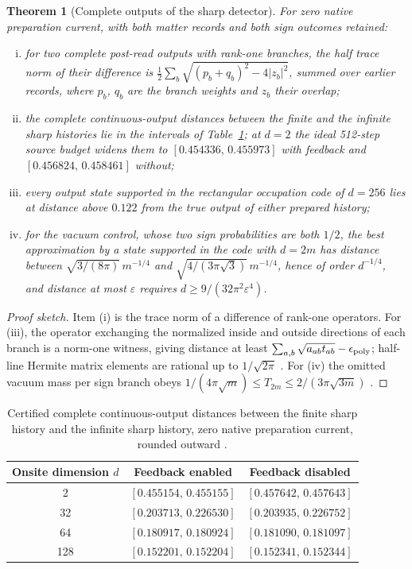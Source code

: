 \documentclass[11pt]{article}
\newtheorem{theorem}{Theorem}[section]
\theoremstyle{definition}
\theoremstyle{remark}
\theoremstyle{plain}
\begin{document}
\begin{theorem}[Complete outputs of the sharp detector]
\label{thm:sharp}
For zero native preparation current, with both matter records and both sign
outcomes retained:
\begin{enumerate}[(i)]
\item for two complete post-read outputs with rank-one branches, the half
trace norm of their difference is
$\frac12\sum_b\sqrt{(p_b+q_b)^2-4\lvert z_b\rvert^2}$, summed over earlier
records, where $p_b$, $q_b$ are the branch weights and $z_b$ their overlap;
\item the complete continuous-output distances between the finite and the
infinite sharp histories lie in the intervals of Table~\ref{tab:sharp}; at
$d=2$ the ideal 512-step source budget widens them to
$[0.454336,\,0.455973]$ with feedback and $[0.456824,\,0.458461]$ without;
\item every output state supported in the rectangular occupation code of
$d=256$ lies at distance above $0.122$ from the true output of either
prepared history;
\item for the vacuum control, whose two sign probabilities are both $1/2$,
the best approximation by a state supported in the code with $d=2m$ has
distance between $\sqrt{3/(8\pi)}\,m^{-1/4}$ and
$\sqrt{4/(3\pi\sqrt3)}\,m^{-1/4}$, hence of order $d^{-1/4}$, and distance at
most $\varepsilon$ requires $d\ge9/(32\pi^2\varepsilon^4)$.
\end{enumerate}
\end{theorem}

\begin{proof}[Proof sketch]
Item (i) is the trace norm of a difference of rank-one operators. For (iii),
the operator exchanging the normalized inside and outside directions of each
branch is a norm-one witness, giving distance at least
$\sum_{a,b}\sqrt{a_{ab}t_{ab}}-\epsilon_{\rm poly}$; half-line Hermite matrix
elements are rational up to $1/\sqrt{2\pi}$ \cite{dlmf}. For (iv) the omitted
vacuum mass per sign branch obeys
$1/(4\pi\sqrt m)\le T_{2m}\le2/(3\pi\sqrt{3m})$ \cite{csREAD}.
\end{proof}

\begin{table}[htbp]
\centering
\small
\caption{Certified complete continuous-output distances between the finite
sharp history and the infinite sharp history, zero native preparation
current, rounded outward \cite{csREADME,rSHARP}.}
\label{tab:sharp}
\begin{tabular}{@{}ccc@{}}
\toprule
Onsite dimension $d$ & Feedback enabled & Feedback disabled\\
\midrule
2 & $[0.455154,\,0.455155]$ & $[0.457642,\,0.457643]$\\
32 & $[0.203713,\,0.226530]$ & $[0.203935,\,0.226752]$\\
64 & $[0.180917,\,0.180924]$ & $[0.181090,\,0.181097]$\\
128 & $[0.152201,\,0.152204]$ & $[0.152341,\,0.152344]$\\
\bottomrule
\end{tabular}
\end{table}
\end{document}
